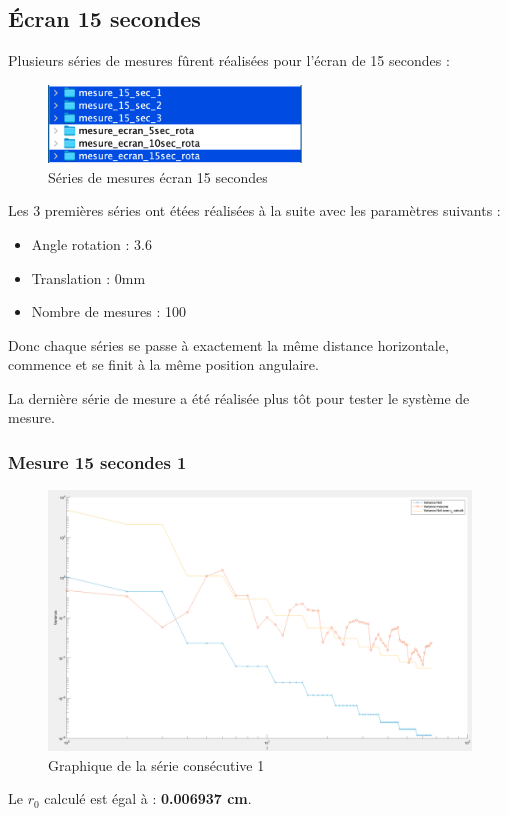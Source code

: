 \subsection{Écran 15 secondes}
Plusieurs séries de mesures fûrent réalisées pour l'écran de 15 secondes :
\begin{figure}[H]
    \centering
    \includegraphics[width = 0.6\textwidth]{assets/figures/mesures/series_mesures_15sec.png}
    \caption{Séries de mesures écran 15 secondes}
\end{figure}
Les 3 premières séries ont étées réalisées à la suite avec les paramètres suivants :
\begin{itemize}
    \item Angle rotation : 3.6\textdegree
    \item Translation : 0mm
    \item Nombre de mesures : 100
\end{itemize}
Donc chaque séries se passe à exactement la même distance horizontale, commence et se finit à la même position angulaire.

La dernière série de mesure a été réalisée plus tôt pour tester le système de mesure.

\subsubsection{Mesure 15 secondes 1}
\begin{figure}[H]
    \centering
    \includegraphics[width = \textwidth]{assets/figures/mesures/mesure_15_sec_1_plot.png}
    \caption{Graphique de la série consécutive 1}
\end{figure}
Le \textbf{$r_0$} calculé est égal à : \textbf{0.006937 cm}.

